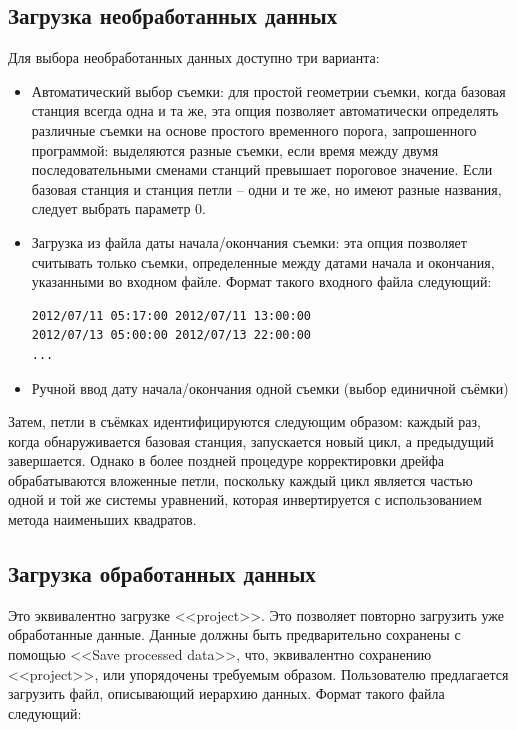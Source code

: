 \subsection[Загрузка необработанных данных]{Загрузка необработанных данных}
\label{subsec:loading_raw_data}

Для выбора необработанных данных доступно три варианта:
\begin{itemize}
    \item Автоматический выбор съемки: для простой геометрии съемки, когда
    базовая станция всегда одна и та же, эта опция позволяет автоматически
    определять различные съемки на основе простого временного порога,
    запрошенного программой: выделяются разные съемки, если время между двумя
    последовательными сменами станций превышает пороговое значение. Если базовая
    станция и станция петли -- одни и те же, но имеют разные названия,
    следует выбрать параметр 0.

    \item Загрузка из файла даты начала/окончания съемки: эта опция позволяет
    считывать только съемки, определенные между датами начала и окончания,
    указанными во входном файле. Формат такого входного файла следующий:

    \begin{verbatim}
2012/07/11 05:17:00 2012/07/11 13:00:00
2012/07/13 05:00:00 2012/07/13 22:00:00
...
    \end{verbatim}
    
    \item Ручной ввод дату начала/окончания одной съемки (выбор единичной 
    съёмки)
    
\end{itemize}

Затем, петли в съёмках идентифицируются следующим образом: каждый раз,
когда обнаруживается базовая станция, запускается новый цикл, а предыдущий
завершается. Однако в более поздней процедуре корректировки дрейфа
обрабатываются вложенные петли, поскольку каждый цикл является частью одной и
той же системы уравнений, которая инвертируется с использованием метода
наименьших квадратов.

\subsection[Загрузка обработанных данных]{Загрузка обработанных данных}
\label{subsec:loading_processed_data}

Это эквивалентно загрузке <<project>>. Это позволяет повторно загрузить уже
обработанные данные. Данные должны быть предварительно сохранены с помощью
<<Save processed data>>, что, эквивалентно сохранению <<project>>, или
упорядочены требуемым образом. Пользователю предлагается загрузить файл,
описывающий иерархию данных. Формат такого файла следующий:

